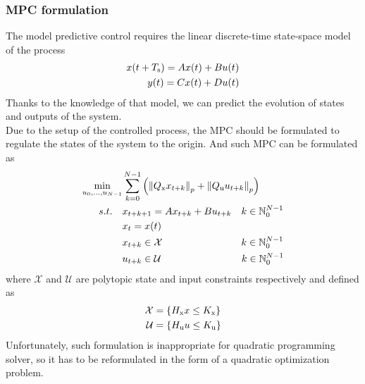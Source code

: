 \subsubsection{MPC formulation}
The model predictive control requires the linear discrete-time state-space model of the process
\begin{subequations}\label{linmodel}
	\begin{align}	
	x(t+T _{\text{s}}) = Ax(t) + Bu(t)\\
	y(t) = Cx(t) + Du(t)
	\end{align}
\end{subequations}
Thanks to the knowledge of that model, we can predict the evolution of states and outputs of the system.\\
Due to the setup of the controlled process, the MPC should be formulated to regulate the states of the system to the origin. And such MPC can be formulated as
\begin{subequations}
	\begin{align}
		\min_{u_0,...,u_{N-1}} &\sum_{k=0}^{N-1} \left( \left\| Q _{\text{x}}x_{t+k}\right\|_p+\left\|Q _{\text{u}}u_{t+k}\right\|_p \right)\\
	    \label{eq217b}s.t.\quad&x_{t+k+1} = Ax_{t+k} + Bu_{t+k}\quad  k \in \mathbb{N}_0^{N-1}\\
		&x_t = x(t)\\
		\label{cst_x}&x_{t+k}\in\mathcal{X}\qquad\qquad\qquad\qquad  k \in \mathbb{N}_0^{N-1}\\
		\label{cst_u}&u_{t+k}\in\mathcal{U}\qquad\qquad\qquad\qquad\,  k \in \mathbb{N}_0^{N-1}
	\end{align}
\end{subequations}
where $\mathcal{X}$ and $\mathcal{U}$ are polytopic state and input constraints respectively and defined as
\begin{subequations}
	\begin{align}
	\mathcal{X} &= \{H _{\text{x}}x\leq K _{\text{x}}\}\\
	\mathcal{U} &= \{H _{\text{u}}u\leq K _{\text{u}}\}
	\end{align}
\end{subequations}
Unfortunately, such formulation is inappropriate for quadratic programming solver, so it has to be reformulated in the form of a quadratic optimization problem.
